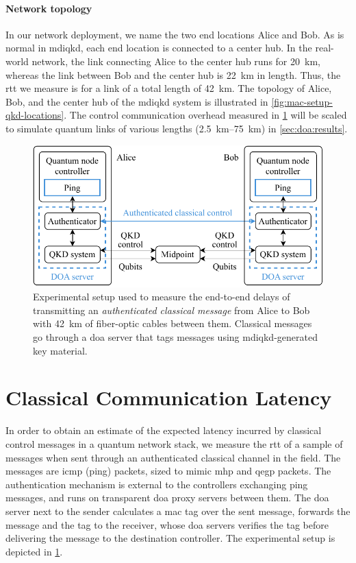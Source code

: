 \paragraph{Network topology}

In our network deployment, we name the two end locations Alice and Bob. As is normal in
\acrshort{mdiqkd}, each end location is connected to a center hub. In the real-world network, the
link connecting Alice to the center hub runs for \qty{20}{\km}, whereas the link between Bob and the
center hub is \qty{22}{\km} in length. Thus, the \acrshort{rtt} we measure is for a link of a total
length of \qty{42}{\km}. The topology of Alice, Bob, and the center hub of the \acrshort{mdiqkd}
system is illustrated in \cref{fig:mac-setup-qkd-locations}. The control communication overhead
measured in \cref{sec:doa:latency} will be scaled to simulate quantum links of various lengths
(\qtyrange{2.5}{75}{\km}) in \cref{sec:doa:results}.

\begin{figure}[t]
    \centering
    \includegraphics[width=0.6\linewidth]{figures/mac-setup-diagram.pdf}
    \caption{
        Experimental setup used to measure the end-to-end delays of transmitting an
        \emph{authenticated classical message} from Alice to Bob with \qty{42}{\km} of fiber-optic
        cables between them. Classical messages go through a \acrshort{doa} server that tags
        messages using \acrshort{mdiqkd}-generated key material.
    }
    \label{fig:mac-setup-diagram}
\end{figure}

\section{Classical Communication Latency}
\label{sec:doa:latency}

In order to obtain an estimate of the expected latency incurred by classical control messages in a
quantum network stack, we measure the \acrfull{rtt} of a sample of messages when sent through an
authenticated classical channel in the field. The messages are \acrshort{icmp} (ping) packets, sized
to mimic \acrshort{mhp} and \acrshort{qegp} packets. The authentication mechanism is external to the
controllers exchanging ping messages, and runs on transparent \acrshort{doa} proxy servers between
them. The \acrshort{doa} server next to the sender calculates a \acrshort{mac} tag over the sent
message, forwards the message and the tag to the receiver, whose \acrshort{doa} servers verifies the
tag before delivering the message to the destination controller. The experimental setup is depicted
in \cref{fig:mac-setup-diagram}.

